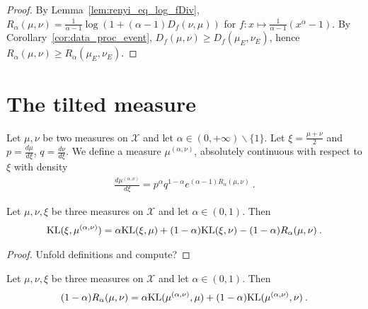 \begin{proof}
By Lemma~\ref{lem:renyi_eq_log_fDiv}, $R_\alpha(\mu, \nu) = \frac{1}{\alpha - 1} \log (1 + (\alpha - 1) D_f(\nu, \mu))$ for $f : x \mapsto \frac{1}{\alpha - 1}(x^{\alpha} - 1)$.
By Corollary~\ref{cor:data_proc_event}, $D_f(\mu, \nu) \ge D_f(\mu_E, \nu_E)$, hence $R_\alpha(\mu, \nu) \ge R_\alpha(\mu_E, \nu_E)$.
\end{proof}

\section{The tilted measure}

\begin{definition}
  \label{def:renyi_measure}
  Let $\mu, \nu$ be two measures on $\mathcal X$ and let $\alpha \in (0, +\infty) \backslash \{1\}$. Let $\xi = \frac{\mu + \nu}{2}$ and $p = \frac{d \mu}{d \xi}$, $q = \frac{d \nu}{d \xi}$. We define a measure $\mu^{(\alpha, \nu)}$, absolutely continuous with respect to $\xi$ with density
  \begin{align*}
  \frac{d \mu^{(\alpha, \nu)}}{d \xi} = p^\alpha q^{1 - \alpha} e^{(\alpha - 1)R_\alpha(\mu, \nu)} \: .
  \end{align*}
\end{definition}

\begin{lemma}
  \label{lem:kl_renyi_measure_eq}
  Let $\mu, \nu, \xi$ be three measures on $\mathcal X$ and let $\alpha \in (0, 1)$. Then
  \begin{align*}
  \mathrm{KL}(\xi, \mu^{(\alpha, \nu)}) = \alpha \mathrm{KL}(\xi, \mu) + (1 - \alpha)\mathrm{KL}(\xi, \nu) - (1 - \alpha) R_\alpha(\mu, \nu) \: .
  \end{align*}
\end{lemma}

\begin{proof}
Unfold definitions and compute?
\end{proof}

\begin{corollary}
  \label{cor:renyi_eq_add_kl}
  Let $\mu, \nu, \xi$ be three measures on $\mathcal X$ and let $\alpha \in (0, 1)$. Then
  \begin{align*}
  (1 - \alpha) R_\alpha(\mu, \nu) = \alpha \mathrm{KL}(\mu^{(\alpha, \nu)}, \mu) + (1 - \alpha)\mathrm{KL}(\mu^{(\alpha, \nu)}, \nu) \: .
  \end{align*}
\end{corollary}

